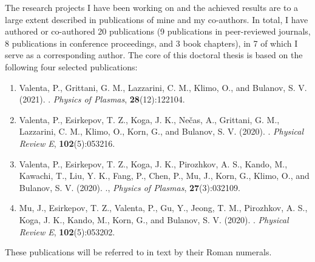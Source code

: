 \documentclass[10pt, a4paper, twoside, openright]{report}
\newcommand{\link}[3][blue]{\href{#2}{\color{#1}{#3}}}%
\begin{document}

The research projects I have been working on and the achieved results are to a large extent described in publications of mine and my co-authors. In total, I have authored or co-authored 20 publications (9 publications in peer-reviewed journals, 8 publications in conference proceedings, and 3 book chapters), in 7 of which I serve as a corresponding author. The core of this doctoral thesis is based on the following four selected publications:
\begin{enumerate}[label=\Roman*.]
	\item \label{paper_1} Valenta, P., Grittani, G. M., Lazzarini, C. M., Klimo, O., and Bulanov, S. V. (2021). \link{https://doi.org/10.1063/5.0065167}{On the electromagnetic-electron rings originating from the interaction of high-power short-pulse laser and underdense plasma}. \textit{Physics of Plasmas}, \textbf{28}(12):122104.
	
	\item \label{paper_2} Valenta, P., Esirkepov, T. Z., Koga, J. K., Nečas, A., Grittani, G. M., Lazzarini, C. M., Klimo, O., Korn, G., and Bulanov, S. V. (2020). \link{https://doi.org/10.1103/PhysRevE.102.053216}{Polarity reversal of wakefields driven by ultrashort pulse laser}. \textit{Physical Review E}, \textbf{102}(5):053216.
	
	\item \label{paper_3} Valenta, P., Esirkepov, T. Z., Koga, J. K., Pirozhkov, A. S., Kando, M., Kawachi, T., Liu, Y. K., Fang, P., Chen, P., Mu, J., Korn, G., Klimo, O., and Bulanov, S. V. (2020). \link{https://doi.org/10.1063/1.5142084}{Recoil effects on reflection from relativistic mirrors in laser plasmas}., \textit{Physics of Plasmas}, \textbf{27}(3):032109.
	
	\item \label{paper_4} Mu, J., Esirkepov, T. Z., Valenta, P., Gu, Y., Jeong, T. M., Pirozhkov, A. S., Koga, J. K., Kando, M., Korn, G., and Bulanov, S. V. (2020). \link{https://doi.org/10.1103/PhysRevE.102.053202}{Relativistic flying forcibly oscillating reflective diffraction grating}. \textit{Physical Review E}, \textbf{102}(5):053202.
	
\end{enumerate}
These publications will be referred to in text by their Roman numerals.

\end{document}
